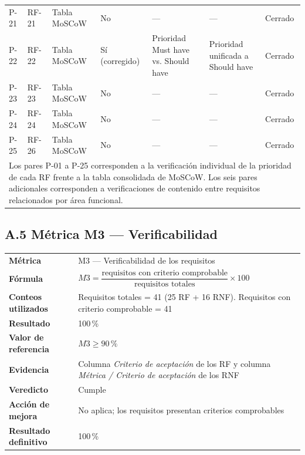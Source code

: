 \begin{tabular}{p{1.6cm}p{2.2cm}p{2.2cm}p{1.6cm}p{2.4cm}p{2.6cm}p{1.6cm}}
P-21 & RF-21 & Tabla MoSCoW & No & --- & --- & Cerrado \\

P-22 & RF-22 & Tabla MoSCoW & Sí (corregido) &
Prioridad Must have vs. Should have &
Prioridad unificada a Should have &
Cerrado \\

P-23 & RF-23 & Tabla MoSCoW & No & --- & --- & Cerrado \\
P-24 & RF-24 & Tabla MoSCoW & No & --- & --- & Cerrado \\
P-25 & RF-26 & Tabla MoSCoW & No & --- & --- & Cerrado \\

\hline

\multicolumn{7}{p{15.9cm}}{
\footnotesize
Los pares P-01 a P-25 corresponden a la verificación individual de la
prioridad de cada RF frente a la tabla consolidada de MoSCoW.
Los seis pares adicionales corresponden a verificaciones de contenido
entre requisitos relacionados por área funcional.
} \\

\hline
\end{tabular}

\subsection*{A.5 Métrica M3 — Verificabilidad}

\begin{tabular}{p{3.2cm}p{9.5cm}}
\hline
\textbf{Métrica} &
M3 — Verificabilidad de los requisitos \\

\textbf{Fórmula} &
$M3 =
\dfrac{\text{requisitos con criterio comprobable}}
{\text{requisitos totales}}\times100$ \\

\textbf{Conteos utilizados} &
Requisitos totales = 41 (25 RF + 16 RNF). \newline
Requisitos con criterio comprobable = 41 \\

\textbf{Resultado} & 100\,\% \\

\textbf{Valor de referencia} & $M3\geq90\,\%$ \\

\textbf{Evidencia} &
Columna \emph{Criterio de aceptación} de los RF y columna
\emph{Métrica / Criterio de aceptación} de los RNF \\

\textbf{Veredicto} & Cumple \\

\textbf{Acción de mejora} &
No aplica; los requisitos presentan criterios comprobables \\

\textbf{Resultado definitivo} & 100\,\% \\

\hline
\end{tabular}

